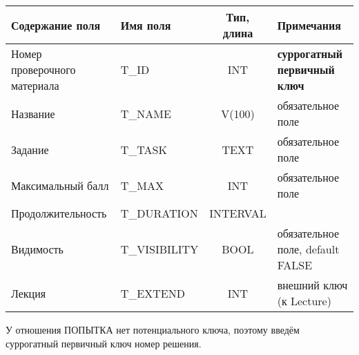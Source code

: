 \documentclass[a4paper,14pt]{article}
\begin{document}
\begin{table}[H]
	\begin{flushleft} 
	\end{flushleft}
\begin{adjustbox}{width=\linewidth}
	\begin{tabular}{|l|l|c|l|}
		\hline
		Содержание поля              & Имя поля      & Тип, длина & Примечания                          \\ \hline
		Номер проверочного материала & T\_ID         &    INT    & \textbf{суррогатный первичный ключ} \\ \hline
		Название                     & T\_NAME       &   V(100)   & обязательное поле                   \\ \hline
		Задание                      & T\_TASK       &    TEXT    & обязательное поле                   \\ \hline
		Максимальный балл            & T\_MAX        &    INT    & обязательное поле                   \\ \hline
		Продолжительность            & T\_DURATION   &  INTERVAL  &                                     \\ \hline
		Видимость                    & T\_VISIBILITY &    BOOL    & обязательное поле, default FALSE    \\ \hline
		Лекция                       & T\_EXTEND     &    INT    & внешний ключ  (к Lecture)      \\ \hline
	\end{tabular}
\end{adjustbox}
\end{table}


У отношения ПОПЫТКА нет потенциального ключа, поэтому введём суррогатный первичный ключ номер решения.
\end{document}
